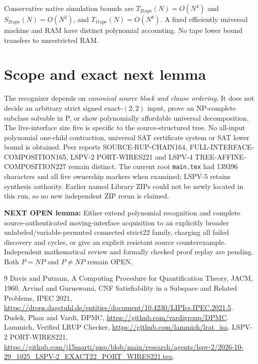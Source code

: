 \documentclass[11pt]{article}
\begin{document}
Conservative native simulation bounds are $T_{\mathrm{2tape}}(N)=O(N^4)$ and $S_{\mathrm{2tape}}(N)=O(N^2)$, and $T_{\mathrm{1tape}}(N)=O(N^8)$. A fixed efficiently universal machine and RAM have distinct polynomial accounting. No tape lower bound transfers to unrestricted RAM.

\section{Scope and exact next lemma}
The recognizer depends on \emph{canonical source block and clause ordering}. It does not decide an arbitrary strict signed exact-$(2,2)$ input, prove an NP-complete subclass solvable in P, or show polynomially affordable universal decomposition. The live-interface size five is specific to the source-structured tree. No all-input polynomial one-child contraction, universal SAT certificate system or SAT lower bound is obtained. Peer reports SOURCE-RUP-CHAIN164, FULL-INTERFACE-COMPOSITION165, LSPV-2 PORT-WIRES221 and LSPV-4 TREE-AFFINE-COMPOSITION227 remain distinct. The current root \texttt{main.tex} had 139396 characters and all five ownership markers when examined; LSPV-5 retains synthesis authority. Earlier named Library ZIPs could not be newly located in this run, so no new independent ZIP rerun is claimed.

\noindent\textbf{NEXT OPEN lemma:} Either extend polynomial recognition and complete source-authenticated moving-interface acquisition to an explicitly broader unlabeled/variable-permuted connected strict22 family, charging all failed discovery and cycles, or give an explicit resistant source counterexample. Independent mathematical review and formally checked proof replay are pending. Both $P=NP$ and $P\ne NP$ remain OPEN.
\begin{thebibliography}{9}
 Davis and Putnam, A Computing Procedure for Quantification Theory, JACM, 1960.
 Arvind and Guruswami, CNF Satisfiability in a Subspace and Related Problems, IPEC 2021, \url{https://drops.dagstuhl.de/entities/document/10.4230/LIPIcs.IPEC.2021.5}.
 Dudek, Phan and Vardi, DPMC, \url{https://github.com/vardigroup/DPMC}.
 Lammich, Verified LRUP Checker, \url{https://github.com/lammich/lrat_isa}.
 LSPV-2 PORT-WIRES221, \url{https://github.com/j15marti/pnp/blob/main/research/agents/lspv-2/2026-10-29_1025_LSPV-2_EXACT22_PORT_WIRES221.tex}.
\end{thebibliography}
\end{document}
